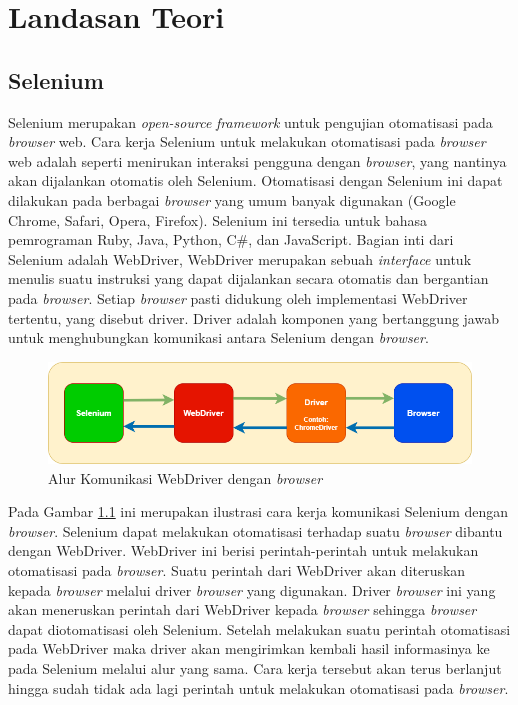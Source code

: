 \chapter{Landasan Teori}
\label{chap:teori}

\section{Selenium}
\label{sec:selenium}
Selenium merupakan \textit{open-source} \textit{framework} untuk pengujian otomatisasi pada \textit{browser} web\cite{selenium}. Cara kerja Selenium untuk melakukan otomatisasi pada \textit{browser} web adalah seperti menirukan interaksi pengguna dengan \textit{browser}, yang nantinya akan dijalankan otomatis oleh Selenium. Otomatisasi dengan Selenium ini dapat dilakukan pada berbagai \textit{browser} yang umum banyak digunakan (Google Chrome, Safari, Opera, Firefox). Selenium ini tersedia untuk bahasa pemrograman Ruby, Java, Python, C\#, dan JavaScript. Bagian inti dari Selenium adalah WebDriver, WebDriver merupakan sebuah \textit{interface} untuk menulis suatu instruksi yang dapat dijalankan secara otomatis dan bergantian pada \textit{browser}. Setiap \textit{browser} pasti didukung oleh implementasi WebDriver tertentu, yang disebut driver. Driver adalah komponen yang bertanggung jawab untuk menghubungkan komunikasi antara Selenium dengan \textit{browser}. 
\begin{figure}[H]
	\centering
	\includegraphics[scale=0.6]{Gambar/flowSelenium.png}
	\caption{Alur Komunikasi WebDriver dengan \textit{browser}} 
	\label{fig:flowSelenium}
\end{figure}
Pada Gambar \ref{fig:flowSelenium} ini merupakan ilustrasi cara kerja komunikasi Selenium dengan \textit{browser}. Selenium dapat melakukan otomatisasi terhadap suatu \textit{browser} dibantu dengan WebDriver. WebDriver ini berisi perintah-perintah untuk melakukan otomatisasi pada \textit{browser}. Suatu perintah dari WebDriver akan diteruskan kepada \textit{browser} melalui driver \textit{browser} yang digunakan. Driver \textit{browser} ini yang akan meneruskan perintah dari WebDriver kepada \textit{browser} sehingga \textit{browser} dapat diotomatisasi oleh Selenium. Setelah melakukan suatu perintah otomatisasi pada WebDriver maka driver akan mengirimkan kembali hasil informasinya ke pada Selenium melalui alur yang sama. Cara kerja tersebut akan terus berlanjut hingga sudah tidak ada lagi perintah untuk melakukan otomatisasi pada \textit{browser}.

